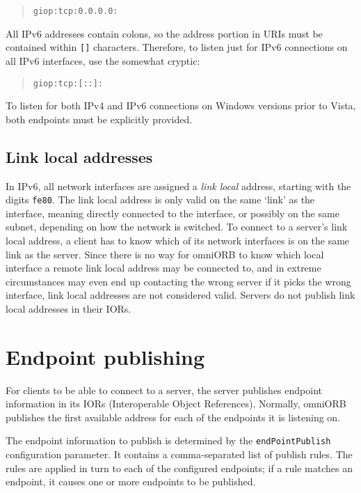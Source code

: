 \documentclass[11pt,oneside,a4paper]{book}
\newcommand{\code}[1]{\texttt{#1}}
\newcommand{\term}[1]{\textit{#1}}
\begin{document}
\begin{quote}
\code{giop:tcp:0.0.0.0:}
\end{quote}

\noindent All IPv6 addresses contain colons, so the address portion in
URIs must be contained within \code{[]} characters. Therefore, to
listen just for IPv6 connections on all IPv6 interfaces, use the
somewhat cryptic:

\begin{quote}
\code{giop:tcp:[::]:}
\end{quote}

\noindent To listen for both IPv4 and IPv6 connections on Windows
versions prior to Vista, both endpoints must be explicitly provided.

\subsection{Link local addresses}

In IPv6, all network interfaces are assigned a \term{link local}
address, starting with the digits \code{fe80}. The link local address
is only valid on the same `link' as the interface, meaning directly
connected to the interface, or possibly on the same subnet, depending
on how the network is switched. To connect to a server's link local
address, a client has to know which of its network interfaces is on
the same link as the server. Since there is no way for omniORB to know
which local interface a remote link local address may be connected to,
and in extreme circumstances may even end up contacting the wrong
server if it picks the wrong interface, link local addresses are not
considered valid. Servers do not publish link local addresses in their
IORs.


\section{Endpoint publishing}

For clients to be able to connect to a server, the server publishes
endpoint information in its IORs (Interoperable Object References).
Normally, omniORB publishes the first available address for each of
the endpoints it is listening on.

The endpoint information to publish is determined by the
\code{endPointPublish} configuration parameter. It contains a
comma-separated list of publish rules. The rules are applied in turn
to each of the configured endpoints; if a rule matches an endpoint, it
causes one or more endpoints to be published.
\end{document}
